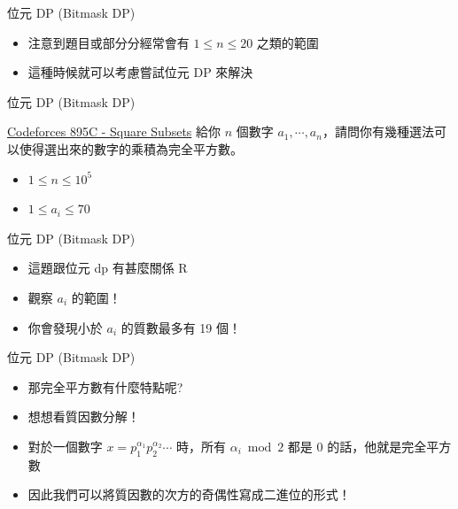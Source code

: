 \documentclass[aspectratio=169]{beamer}
\begin{document}
    \begin{frame}{位元 DP (Bitmask DP)}
        \begin{itemize}
            \item 注意到題目或部分分經常會有 $1 \le n \le 20$ 之類的範圍
            \item 這種時候就可以考慮嘗試位元 DP 來解決
        \end{itemize}
    \end{frame}
    
    \begin{frame}{位元 DP (Bitmask DP)}
        \begin{block}{\href{https://codeforces.com/contest/895/problem/C}{Codeforces 895C - Square Subsets}}
            給你 $n$ 個數字 $a_1, \cdots,a_n$，請問你有幾種選法可以使得選出來的數字的乘積為完全平方數。
            \begin{itemize}
                \item $1 \leq n \leq 10^5$
                \item $1 \le a_i \le 70$
            \end{itemize}
        \end{block}
    \end{frame}
    
    \begin{frame}{位元 DP (Bitmask DP)}
        \begin{itemize}
            \item 這題跟位元 dp 有甚麼關係 R
            \item<2-> 觀察 $a_i$ 的範圍！
            \item<3-> 你會發現小於 $a_i$ 的質數最多有 19 個！
        \end{itemize}
    \end{frame}
            

    \begin{frame}{位元 DP (Bitmask DP)}
        \begin{itemize}
            \item 那完全平方數有什麼特點呢? 
            \item<2-> 想想看質因數分解！
            \item<3-> 對於一個數字 $x = p_1^{\alpha_1} p_2^{\alpha_2} \cdots$ 時，所有 $\alpha_i \bmod 2$ 都是 $0$ 的話，他就是完全平方數
            \item<4-> 因此我們可以將質因數的次方的奇偶性寫成二進位的形式！
        \end{itemize}
    \end{frame}
    
\end{document}
